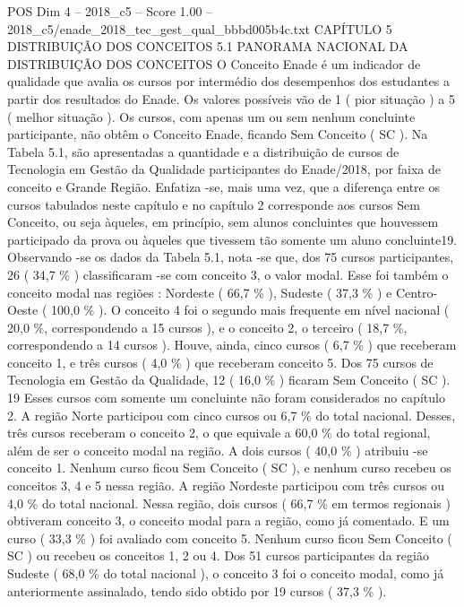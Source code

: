 \begin{textsample}{POS Dim 4 – 2018\_c5 – Score 1.00 – 2018\_c5/enade\_2018\_tec\_gest\_qual\_bbbd005b4c.txt}  \label{ex:f4_pos_226}
CAPÍTULO 5 DISTRIBUIÇÃO DOS CONCEITOS 5.1 PANORAMA NACIONAL DA DISTRIBUIÇÃO DOS CONCEITOS O Conceito Enade é um indicador de qualidade que avalia os cursos por intermédio dos desempenhos dos estudantes a partir dos resultados do Enade.
Os valores possíveis vão de 1 ( pior situação ) a 5 ( melhor situação ).
Os cursos, com apenas um ou sem nenhum concluinte participante, não obtêm o Conceito Enade, ficando Sem Conceito ( SC ).
Na Tabela 5.1, são apresentadas a quantidade e a distribuição de cursos de Tecnologia em Gestão da Qualidade participantes do Enade/2018, por faixa de conceito e Grande Região.
Enfatiza -se, mais uma vez, que a diferença entre os cursos tabulados neste capítulo e no capítulo 2 corresponde aos cursos Sem Conceito, ou seja àqueles, em princípio, sem alunos concluintes que houvessem participado da prova ou àqueles que tivessem tão somente um aluno concluinte19.
Observando -se os dados da Tabela 5.1, nota -se que, dos 75 cursos participantes, 26 ( 34,7 \% ) classificaram -se com conceito 3, o valor modal.
Esse foi também o conceito modal nas regiões : Nordeste ( 66,7 \% ), Sudeste ( 37,3 \% ) e Centro-Oeste ( 100,0 \% ).
O conceito 4 foi o segundo mais frequente em nível nacional ( 20,0 \%, correspondendo a 15 cursos ), e o conceito 2, o terceiro ( 18,7 \%, correspondendo a 14 cursos ).
Houve, ainda, cinco cursos ( 6,7 \% ) que receberam conceito 1, e três cursos ( 4,0 \% ) que receberam conceito 5.
Dos 75 cursos de Tecnologia em Gestão da Qualidade, 12 ( 16,0 \% ) ficaram Sem Conceito ( SC ). 19 Esses cursos com somente um concluinte não foram considerados no capítulo 2.
A região Norte participou com cinco cursos ou 6,7 \% do total nacional.
Desses, três cursos receberam o conceito 2, o que equivale a 60,0 \% do total regional, além de ser o conceito modal na região.
A dois cursos ( 40,0 \% ) atribuiu -se conceito 1.
Nenhum curso ficou Sem Conceito ( SC ), e nenhum curso recebeu os conceitos 3, 4 e 5 nessa região.
A região Nordeste participou com três cursos ou 4,0 \% do total nacional.
Nessa região, dois cursos ( 66,7 \% em termos regionais ) obtiveram conceito 3, o conceito modal para a região, como já comentado.
E um curso ( 33,3 \% ) foi avaliado com conceito 5.
Nenhum curso ficou Sem Conceito ( SC ) ou recebeu os conceitos 1, 2 ou 4.
Dos 51 cursos participantes da região Sudeste ( 68,0 \% do total nacional ), o conceito 3 foi o conceito modal, como já anteriormente assinalado, tendo sido obtido por 19 cursos ( 37,3 \% ).

\end{textsample}
